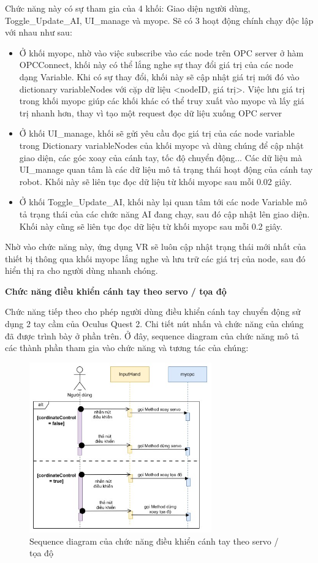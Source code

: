 Chức năng này có sự tham gia của 4 khối: Giao diện người dùng, Toggle\_Update\_AI, UI\_manage và myopc. Sẽ có 3 hoạt động chính chạy độc lập với nhau như sau:
\begin{itemize}
    \item Ở khối myopc, nhờ vào việc subscribe vào các node trên OPC server ở hàm OPCConnect, khối này có thể lắng nghe sự thay đổi giá trị của các node dạng Variable. Khi có sự thay đổi, khối này sẽ cập nhật giá trị mới đó vào dictionary variableNodes với cặp dữ liệu <nodeID, giá trị>. Việc lưu giá trị trong khối myopc giúp các khối khác có thể truy xuất vào myopc và lấy giá trị nhanh hơn, thay vì tạo một request đọc dữ liệu xuống OPC server
    \item Ở khối UI\_manage, khối sẽ gửi yêu cầu đọc giá trị của các node variable trong Dictionary variableNodes của khối myopc và dùng chúng để cập nhật giao diện, các góc xoay của cánh tay, tốc độ chuyển động... Các dữ liệu mà UI\_manage quan tâm là các dữ liệu mô tả trạng thái hoạt động của cánh tay robot. Khối này sẽ liên tục đọc dữ liệu từ khối myopc sau mỗi 0.02 giây.
    \item Ở khối Toggle\_Update\_AI, khối này lại quan tâm tới các node Variable mô tả trạng thái của các chức năng AI đang chạy, sau đó cập nhật lên giao diện. Khối này cũng sẽ liên tục đọc dữ liệu từ khối myopc sau mỗi 0.2 giây.
\end{itemize}

Nhờ vào chức năng này, ứng dụng VR sẽ luôn cập nhật trạng thái mới nhất của thiết bị thông qua khối myopc lắng nghe và lưu trữ các giá trị của node, sau đó hiển thị ra cho người dùng nhanh chóng.

\textbf{Chức năng điều khiển cánh tay theo servo / tọa độ} 

Chức năng tiếp theo cho phép người dùng điều khiển cánh tay chuyển động sử dụng 2 tay cầm của Oculus Quest 2. Chi tiết nút nhấn và chức năng của chúng đã được trình bày ở phần trên. Ở đây, sequence diagram của chức năng mô tả các thành phần tham gia vào chức năng và tương tác của chúng:

\begin{figure}[H]
    \centering
    \includegraphics[width=0.7\textwidth]{Images/Implementation/VRapp/Vr_controller.jpg}
    \caption{Sequence diagram của chức năng điều khiển cánh tay theo servo / tọa độ}
    \label{fig:seq_controller}
\end{figure}

